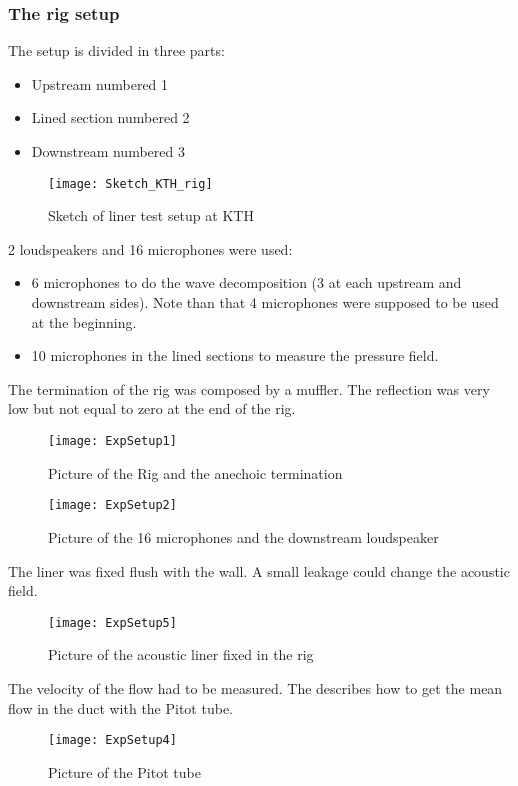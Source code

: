 \subsubsection{The rig setup}
The setup is divided in three parts: 
\begin{itemize}
    \item Upstream numbered 1
    \item Lined section numbered 2
    \item Downstream numbered 3
\end{itemize}
\begin{figure}[H] \centering
    \texttt{[image: Sketch\_KTH\_rig]}
    \caption{Sketch of liner test setup at KTH}
\end{figure}
2 loudspeakers and 16 microphones were used:
\begin{itemize}
    \item 6 microphones to do the wave decomposition (3 at each upstream and downstream sides). Note than that 4 microphones were supposed to be used at the beginning.
    \item 10 microphones in the lined sections to measure the pressure field.
\end{itemize}
The termination of the rig was composed by a muffler. The reflection was very low but not equal to zero at the end of the rig.
\begin{figure}[H] \centering
    \texttt{[image: ExpSetup1]}
    \caption{Picture of the Rig and the anechoic termination}
\end{figure}
\begin{figure}[H] \centering
    \texttt{[image: ExpSetup2]}
    \caption{Picture of the 16 microphones and the downstream loudspeaker}
\end{figure}
\noindent The liner was fixed flush with the wall. A small leakage could change the acoustic field.
\begin{figure}[H] \centering
    \texttt{[image: ExpSetup5]}
    \caption{Picture of the acoustic liner fixed in the rig}
\end{figure}
\noindent The velocity of the flow had to be measured. The  describes how to get the mean flow in the duct with the Pitot tube.
\begin{figure}[H] \centering
    \texttt{[image: ExpSetup4]}
    \caption{Picture of the Pitot tube}
\end{figure}
